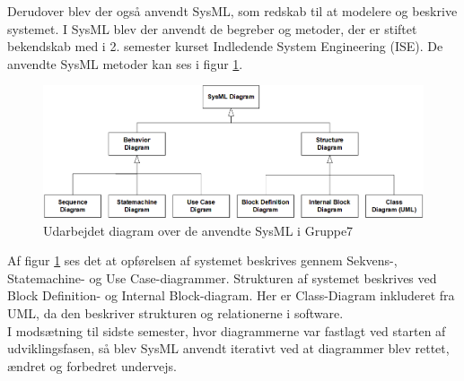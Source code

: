\documentclass[Rapport/Rapport_main.tex]{subfiles}
\begin{document}
Derudover blev der også anvendt SysML, som redskab til at modelere og beskrive systemet. I SysML blev der anvendt de begreber og metoder, der er stiftet bekendskab med i 2. semester kurset Indledende System Engineering (ISE). De anvendte SysML metoder kan ses i figur \ref{fig:rap_sysml_usage}.
\begin{figure}[H]
    \centering
    \includegraphics[width=\textwidth]{Processdokument/graphics/Sysml_usage.png}
    \caption{Udarbejdet diagram over de anvendte SysML i Gruppe7}
    \label{fig:rap_sysml_usage}
\end{figure}
Af figur \ref{fig:rap_sysml_usage} ses det at opførelsen af systemet beskrives gennem Sekvens-, Statemachine- og Use Case-diagrammer.
Strukturen af systemet beskrives ved Block Definition- og Internal Block-diagram. Her er Class-Diagram inkluderet fra UML, da den beskriver strukturen og relationerne i software.\\
I modsætning til sidste semester, hvor diagrammerne var fastlagt ved starten af udviklingsfasen, så blev SysML anvendt iterativt ved at diagrammer blev rettet, ændret og forbedret undervejs. 
\end{document}
